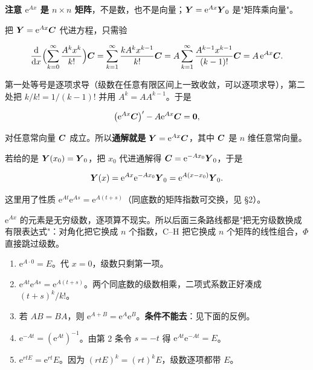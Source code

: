 \documentclass[11pt]{ctexart}
\begin{document}
\textbf{注意 $\mathrm{e}^{Ax}$ 是 $n\times n$ 矩阵}，不是数，也不是向量；$\boldsymbol{Y}=\mathrm{e}^{Ax}\boldsymbol{Y}_0$ 是"矩阵乘向量"。


把 $\boldsymbol{Y}=\mathrm{e}^{Ax}\boldsymbol{C}$ 代进方程，只需验

\[
\frac{\mathrm{d}}{\mathrm{d}x}\Bigl(\sum_{k=0}^{\infty}\frac{A^kx^k}{k!}\Bigr)\boldsymbol{C}
=\sum_{k=1}^{\infty}\frac{kA^kx^{k-1}}{k!}\boldsymbol{C}
=A\sum_{k=1}^{\infty}\frac{A^{k-1}x^{k-1}}{(k-1)!}\boldsymbol{C}
=A\,\mathrm{e}^{Ax}\boldsymbol{C}.
\]

第一处等号是逐项求导（级数在任意有限区间上一致收敛，可以逐项求导），第二处把 $k/k!=1/(k-1)!$ 并用 $A^k=AA^{k-1}$。于是

\[
\bigl(\mathrm{e}^{Ax}\boldsymbol{C}\bigr)'-A\mathrm{e}^{Ax}\boldsymbol{C}=\boldsymbol{0},
\]

对任意常向量 $\boldsymbol{C}$ 成立。所以\textbf{通解就是} $\boldsymbol{Y}=\mathrm{e}^{Ax}\boldsymbol{C}$，其中 $\boldsymbol{C}$ 是 $n$ 维任意常向量。


若给的是 $\boldsymbol{Y}(x_0)=\boldsymbol{Y}_0$，把 $x_0$ 代进通解得 $\boldsymbol{C}=\mathrm{e}^{-Ax_0}\boldsymbol{Y}_0$，于是

\[
\boldsymbol{Y}(x)=\mathrm{e}^{Ax}\mathrm{e}^{-Ax_0}\boldsymbol{Y}_0=\mathrm{e}^{A(x-x_0)}\boldsymbol{Y}_0 .
\]

这里用了性质 $\mathrm{e}^{At}\mathrm{e}^{As}=\mathrm{e}^{A(t+s)}$（同底数的矩阵指数可交换，见 §2）。


$\mathrm{e}^{Ax}$ 的元素是无穷级数，逐项算不现实。所以后面三条路线都是"把无穷级数换成有限表达式"：对角化把它换成 $n$ 个指数，C--H 把它换成 $n$ 个矩阵的线性组合，$\Phi$ 直接跳过级数。



\begin{enumerate}
  \item $\mathrm{e}^{A\cdot0}=E$。代 $x=0$，级数只剩第一项。
  \item $\mathrm{e}^{At}\mathrm{e}^{As}=\mathrm{e}^{A(t+s)}$。两个同底数的级数相乘，二项式系数正好凑成 $(t+s)^k/k!$。
  \item 若 $AB=BA$，则 $\mathrm{e}^{A+B}=\mathrm{e}^A\mathrm{e}^B$。\textbf{条件不能去}：见下面的反例。
  \item $\mathrm{e}^{-At}=(\mathrm{e}^{At})^{-1}$。由第 2 条令 $s=-t$ 得 $\mathrm{e}^{At}\mathrm{e}^{-At}=E$。
  \item $\mathrm{e}^{rtE}=\mathrm{e}^{rt}E$。因为 $(rtE)^k=(rt)^kE$，级数逐项都带 $E$。
\end{enumerate}
\end{document}
